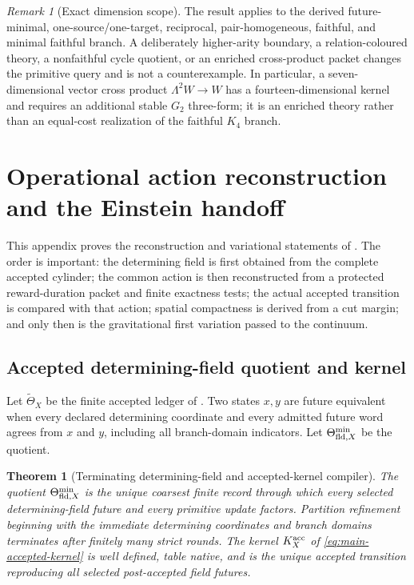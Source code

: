 \documentclass[11pt]{article}
\newtheorem{theorem}{Theorem}[section]
\theoremstyle{definition}
\theoremstyle{remark}
\newtheorem{remark}[remark]{Remark}
\begin{document}
\begin{remark}[Exact dimension scope]
The result applies to the derived future-minimal, one-source/one-target, reciprocal,
pair-homogeneous, faithful, and minimal faithful branch.  A deliberately
higher-arity boundary, a relation-coloured theory, a nonfaithful cycle quotient,
or an enriched cross-product packet changes the primitive query and is not a
counterexample.  In particular, a seven-dimensional vector cross product
$\Lambda^2W\to W$ has a fourteen-dimensional kernel and requires an additional
stable $G_2$ three-form; it is an enriched theory rather than an equal-cost
realization of the faithful $K_4$ branch.
\end{remark}


\section{Operational action reconstruction and the Einstein handoff}
\label{supp:dynamics}

This appendix proves the reconstruction and variational statements of
.  The order is important: the determining field is
first obtained from the complete accepted cylinder; the common action is then
reconstructed from a protected reward-duration packet and finite exactness
tests; the actual accepted transition is compared with that action; spatial
compactness is derived from a cut margin; and only then is the gravitational
first variation passed to the continuum.

\subsection{Accepted determining-field quotient and kernel}

Let $\widetilde\Theta_X$ be the finite accepted ledger of
.  Two states $x,y$ are future equivalent when
every declared determining coordinate and every admitted future word agrees
from $x$ and $y$, including all branch-domain indicators.  Let
$\Theta_{{\rm fld},X}^{\min}$ be the quotient.

\begin{theorem}[Terminating determining-field and accepted-kernel compiler]
\label{thm:supp-determining-kernel}
The quotient $\Theta_{{\rm fld},X}^{\min}$ is the unique coarsest finite record
through which every selected determining-field future and every primitive update
factors.  Partition refinement beginning with the immediate determining
coordinates and branch domains terminates after finitely many strict rounds.
The kernel $K_X^{\rm acc}$ of \eqref{eq:main-accepted-kernel} is well defined,
table native, and is the unique accepted transition reproducing all selected
post-accepted field futures.
\end{theorem}
\end{document}
